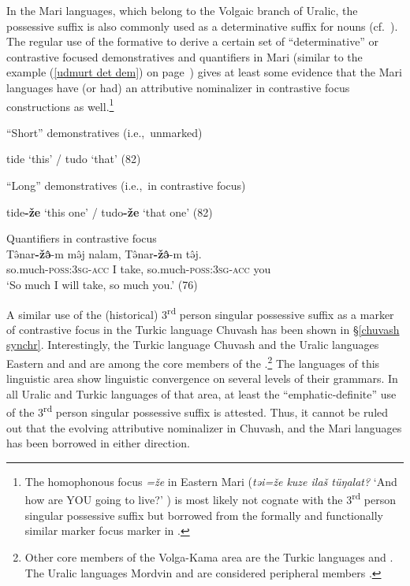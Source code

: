 In the Mari languages, which belong to the Volgaic branch of Uralic, the possessive suffix is also commonly used as a determinative suffix for nouns (cf.~\citealt[75–76]{alhoniemi1993}). The regular use of the formative to derive a certain set of “determinative” or contrastive focused demonstratives and quantifiers in Mari (similar to the  example (\ref{udmurt det dem}) on page~\pageref{udmurt det dem}) gives at least some evidence that the Mari languages have (or had) an attributive nominalizer in contrastive focus constructions as well.\footnote{The homophonous focus  \textit{=že} in Eastern Mari (\textit{təi=že kuze ilaš tüŋalat?} ‘And how are YOU going to live?’ \citealt[80]{alhoniemi1993}) is most likely not cognate with the 3\textsuperscript{rd} person singular possessive suffix but borrowed from the formally and functionally similar marker focus marker in .}%
\begin{exe}
\ex {}
\begin{xlist}
\ex \rm{“Short” demonstratives (i.e.,~unmarked)} 
\begin{xlist}
\ex tide \rm{‘this’ /} tudo \rm{‘that’ (82)}
\end{xlist}
\ex \rm{“Long” demonstratives (i.e.,~in contrastive focus)}
\begin{xlist}
\ex tide\textbf{-že} \rm{‘this one’ /} tudo\textbf{-že} \rm{‘that one’ (82)}%
\end{xlist}
\ex \rm{Quantifiers in contrastive focus}\\
\gll	Tə̂nar\textbf{-žə̂}-m mə̂j nalam, Tə̂nar\textbf{-žə̂}-m tə̂j.\\
	so.much-\textsc{poss:3sg}-\textsc{acc} I take, so.much-\textsc{poss:3sg}-\textsc{acc} you\\
\glt	‘So much I will take, so much you.’ (76)
\end{xlist}
\end{exe}
A similar use of the (historical) 3\textsuperscript{rd} person singular possessive suffix as a marker of contrastive focus in the Turkic language Chuvash has been shown in \S\ref{chuvash synchr}. Interestingly, the Turkic language Chuvash and the Uralic languages Eastern and  and  are among the core members of the .\footnote{Other core members of the Volga-Kama  area are the Turkic languages  and . The Uralic languages Mordvin and  are considered peripheral members \citep{helimski2005}.} The languages of this linguistic area show linguistic convergence on several levels of their grammars. In all Uralic and Turkic languages of that area, at least the “emphatic-definite” use of the 3\textsuperscript{rd} person singular possessive suffix is attested. Thus, it cannot be ruled out that the evolving attributive nominalizer in Chuvash,  and the Mari languages has been borrowed in either direction.%

